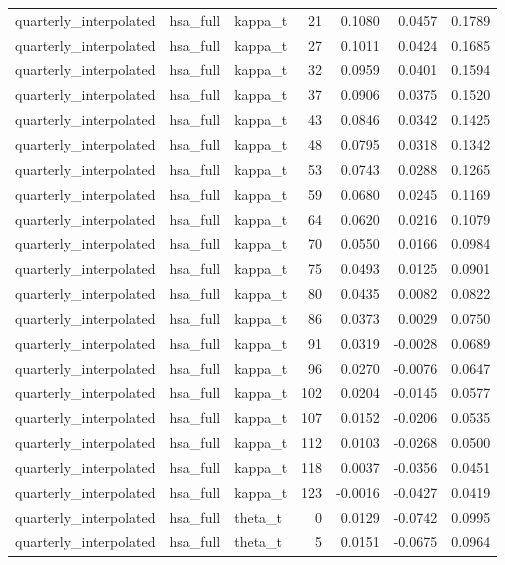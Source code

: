 \begin{tabular}{lllrrrr}
quarterly\_interpolated & hsa\_full & kappa\_t & 21 & 0.1080 & 0.0457 & 0.1789 \\
quarterly\_interpolated & hsa\_full & kappa\_t & 27 & 0.1011 & 0.0424 & 0.1685 \\
quarterly\_interpolated & hsa\_full & kappa\_t & 32 & 0.0959 & 0.0401 & 0.1594 \\
quarterly\_interpolated & hsa\_full & kappa\_t & 37 & 0.0906 & 0.0375 & 0.1520 \\
quarterly\_interpolated & hsa\_full & kappa\_t & 43 & 0.0846 & 0.0342 & 0.1425 \\
quarterly\_interpolated & hsa\_full & kappa\_t & 48 & 0.0795 & 0.0318 & 0.1342 \\
quarterly\_interpolated & hsa\_full & kappa\_t & 53 & 0.0743 & 0.0288 & 0.1265 \\
quarterly\_interpolated & hsa\_full & kappa\_t & 59 & 0.0680 & 0.0245 & 0.1169 \\
quarterly\_interpolated & hsa\_full & kappa\_t & 64 & 0.0620 & 0.0216 & 0.1079 \\
quarterly\_interpolated & hsa\_full & kappa\_t & 70 & 0.0550 & 0.0166 & 0.0984 \\
quarterly\_interpolated & hsa\_full & kappa\_t & 75 & 0.0493 & 0.0125 & 0.0901 \\
quarterly\_interpolated & hsa\_full & kappa\_t & 80 & 0.0435 & 0.0082 & 0.0822 \\
quarterly\_interpolated & hsa\_full & kappa\_t & 86 & 0.0373 & 0.0029 & 0.0750 \\
quarterly\_interpolated & hsa\_full & kappa\_t & 91 & 0.0319 & -0.0028 & 0.0689 \\
quarterly\_interpolated & hsa\_full & kappa\_t & 96 & 0.0270 & -0.0076 & 0.0647 \\
quarterly\_interpolated & hsa\_full & kappa\_t & 102 & 0.0204 & -0.0145 & 0.0577 \\
quarterly\_interpolated & hsa\_full & kappa\_t & 107 & 0.0152 & -0.0206 & 0.0535 \\
quarterly\_interpolated & hsa\_full & kappa\_t & 112 & 0.0103 & -0.0268 & 0.0500 \\
quarterly\_interpolated & hsa\_full & kappa\_t & 118 & 0.0037 & -0.0356 & 0.0451 \\
quarterly\_interpolated & hsa\_full & kappa\_t & 123 & -0.0016 & -0.0427 & 0.0419 \\
quarterly\_interpolated & hsa\_full & theta\_t & 0 & 0.0129 & -0.0742 & 0.0995 \\
quarterly\_interpolated & hsa\_full & theta\_t & 5 & 0.0151 & -0.0675 & 0.0964 \\

\end{tabular}
